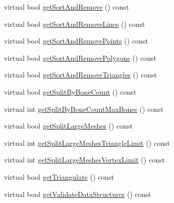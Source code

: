 \begin{DoxyCompactItemize}
\item 
virtual bool \hyperlink{classrepo_1_1manipulator_1_1modelconvertor_1_1_model_import_config_afa5a790eef9c738bf4cb1facd5bd187d}{get\+Sort\+And\+Remove} () const 
\item 
virtual bool \hyperlink{classrepo_1_1manipulator_1_1modelconvertor_1_1_model_import_config_a4fdc5bd7e139c6b8eb08ed5e05100dae}{get\+Sort\+And\+Remove\+Lines} () const 
\item 
virtual bool \hyperlink{classrepo_1_1manipulator_1_1modelconvertor_1_1_model_import_config_a9baa502ef59aff4d587587d70aef8ddb}{get\+Sort\+And\+Remove\+Points} () const 
\item 
virtual bool \hyperlink{classrepo_1_1manipulator_1_1modelconvertor_1_1_model_import_config_ad787431a2bddbb771ce471732aff24e6}{get\+Sort\+And\+Remove\+Polygons} () const 
\item 
virtual bool \hyperlink{classrepo_1_1manipulator_1_1modelconvertor_1_1_model_import_config_ac7998c1c9af1d593be702670630799ad}{get\+Sort\+And\+Remove\+Triangles} () const 
\item 
virtual bool \hyperlink{classrepo_1_1manipulator_1_1modelconvertor_1_1_model_import_config_a934f64b93300a406890d4dcd0e381117}{get\+Split\+By\+Bone\+Count} () const 
\item 
virtual int \hyperlink{classrepo_1_1manipulator_1_1modelconvertor_1_1_model_import_config_a259bb22eb7d32fb98292a0cc7d0d459c}{get\+Split\+By\+Bone\+Count\+Max\+Bones} () const 
\item 
virtual bool \hyperlink{classrepo_1_1manipulator_1_1modelconvertor_1_1_model_import_config_ae5433b44a2803d6df0dc03611255b895}{get\+Split\+Large\+Meshes} () const 
\item 
virtual int \hyperlink{classrepo_1_1manipulator_1_1modelconvertor_1_1_model_import_config_a24c2d57baf2dbcaea7d406c6a197a703}{get\+Split\+Large\+Meshes\+Triangle\+Limit} () const 
\item 
virtual int \hyperlink{classrepo_1_1manipulator_1_1modelconvertor_1_1_model_import_config_acbc9aa1654b823398c478c88b659ab91}{get\+Split\+Large\+Meshes\+Vertex\+Limit} () const 
\item 
virtual bool \hyperlink{classrepo_1_1manipulator_1_1modelconvertor_1_1_model_import_config_a27dac7c3842f90153c970a522fddea1e}{get\+Triangulate} () const 
\item 
virtual bool \hyperlink{classrepo_1_1manipulator_1_1modelconvertor_1_1_model_import_config_acbdc61bf3a1204b85826f4cca4867ced}{get\+Validate\+Data\+Structures} () const 
\item 

\end{DoxyCompactItemize}
